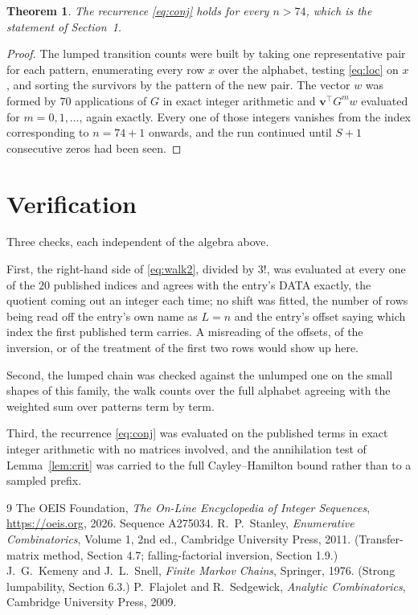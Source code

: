 \documentclass[11pt,a4paper]{article}
\theoremstyle{plain}
\newtheorem{theorem}{Theorem}
\theoremstyle{definition}
\begin{document}
\begin{theorem}
The recurrence \eqref{eq:conj} holds for every $n>74$, which is the statement of
Section~1.
\end{theorem}

\begin{proof}
The lumped transition counts were built by taking one representative pair for each pattern,
enumerating every row $x$ over the alphabet, testing \eqref{eq:loc} on $x$, and sorting
the survivors by the pattern of the new pair. The vector $w$ was formed by $70$
applications of $G$ in exact integer arithmetic and $\mathbf{v}^{\!\top}G^{m}w$
evaluated for $m=0,1,\dots$, again exactly. Every one of those integers vanishes from the
index corresponding to $n=74+1$ onwards, and the run continued until $S+1$ consecutive
zeros had been seen.
\end{proof}

\section{Verification}

Three checks, each independent of the algebra above.

First, the right-hand side of \eqref{eq:walk2}, divided by $3!$, was evaluated at every
one of the $20$ published indices and agrees with the entry's DATA exactly, the quotient
coming out an integer each time; no shift was fitted, the number of rows being read off the
entry's own name as $L=n$ and the entry's offset saying which index the first published
term carries. A misreading of the offsets, of the inversion, or of the treatment of the first
two rows would show up here.

Second, the lumped chain was checked against the unlumped one on the small shapes of this
family, the walk counts over the full alphabet agreeing with the weighted sum over patterns
term by term.

Third, the recurrence \eqref{eq:conj} was evaluated on the published terms in exact integer
arithmetic with no matrices involved, and the annihilation test of Lemma~\ref{lem:crit} was
carried to the full Cayley--Hamilton bound rather than to a sampled prefix.

\begin{thebibliography}{9}
 The OEIS Foundation, \emph{The On-Line Encyclopedia of Integer
Sequences}, \url{https://oeis.org}, 2026. Sequence A275034.
 R.~P.~Stanley, \emph{Enumerative Combinatorics}, Volume 1, 2nd ed.,
Cambridge University Press, 2011. (Transfer-matrix method, Section 4.7; falling-factorial
inversion, Section 1.9.)
 J.~G.~Kemeny and J.~L.~Snell, \emph{Finite Markov Chains}, Springer,
1976. (Strong lumpability, Section 6.3.)
 P.~Flajolet and R.~Sedgewick, \emph{Analytic Combinatorics}, Cambridge
University Press, 2009.
\end{thebibliography}
\end{document}
